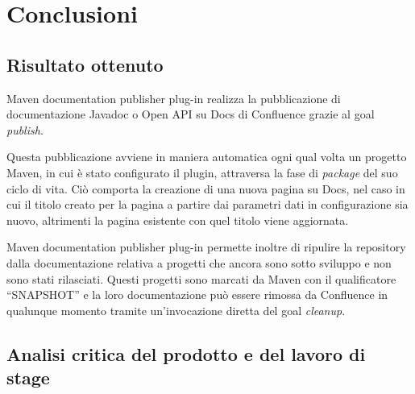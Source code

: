 
\chapter{Conclusioni}
\label{cap:conclusioni}

\section{Risultato ottenuto}

Maven documentation publisher plug-in realizza la pubblicazione di documentazione Javadoc o Open API su Docs di Confluence grazie al goal \emph{publish}.

Questa pubblicazione avviene in maniera automatica ogni qual volta un progetto Maven, in cui è stato configurato il plugin, attraversa la fase di \emph{package} del suo ciclo di vita.
Ciò comporta la creazione di una nuova pagina su Docs, nel caso in cui il titolo creato per la pagina a partire dai parametri dati in configurazione sia nuovo, altrimenti la pagina esistente con quel titolo viene aggiornata.

Maven documentation publisher plug-in permette inoltre di ripulire la repository dalla documentazione relativa a progetti che ancora sono sotto sviluppo e non sono stati rilasciati.
Questi progetti sono marcati da Maven con il qualificatore ``SNAPSHOT'' e la loro documentazione può essere rimossa da Confluence in qualunque momento tramite un'invocazione diretta del goal \emph{cleanup}.

\section{Analisi critica del prodotto e del lavoro di stage}

